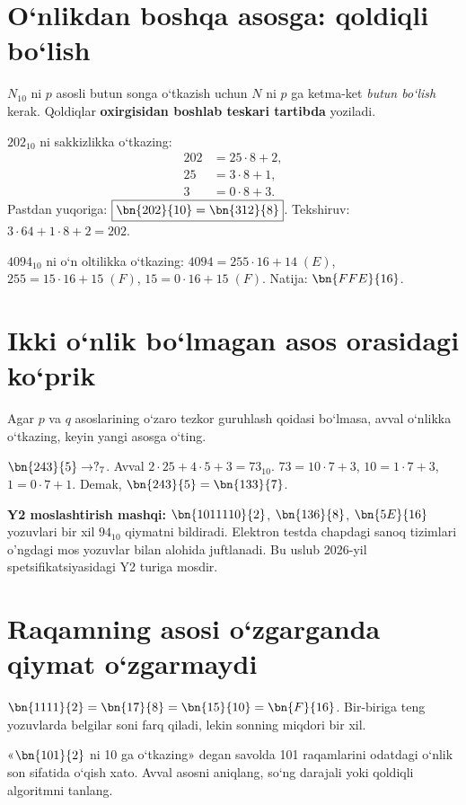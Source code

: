 \documentclass[11pt,a4paper,openany,oneside]{book}
\begin{document}
\section{O‘nlikdan boshqa asosga: qoldiqli bo‘lish}
\begin{definition}
\(N_{10}\) ni \(p\) asosli butun songa o‘tkazish uchun \(N\) ni \(p\) ga ketma-ket \emph{butun bo‘lish} kerak. Qoldiqlar \textbf{oxirgisidan boshlab teskari tartibda} yoziladi. 
\end{definition}
\begin{worked}
\(202_{10}\) ni sakkizlikka o‘tkazing:
\[\begin{aligned}
202 &= 25\cdot8+2,\\ 25&=3\cdot8+1,\\3&=0\cdot8+3.
\end{aligned}\]
Pastdan yuqoriga: \(\boxed{\bn{202}{10}=\bn{312}{8}}\). Tekshiruv: \(3\cdot64+1\cdot8+2=202\).
\end{worked}
\begin{worked}
\(4094_{10}\) ni o‘n oltilikka o‘tkazing:
\(4094=255\cdot16+14\;(E)\), \(255=15\cdot16+15\;(F)\), \(15=0\cdot16+15\;(F)\). Natija: \(\bn{FFE}{16}\).
\end{worked}
\section{Ikki o‘nlik bo‘lmagan asos orasidagi ko‘prik}
Agar \(p\) va \(q\) asoslarining o‘zaro tezkor guruhlash qoidasi bo‘lmasa, avval o‘nlikka o‘tkazing, keyin yangi asosga o‘ting.
\begin{worked}
\(\bn{243}{5}\to ?_7\). Avval \(2\cdot25+4\cdot5+3=73_{10}\). \(73=10\cdot7+3\), \(10=1\cdot7+3\), \(1=0\cdot7+1\). Demak, \(\bn{243}{5}=\bn{133}{7}\).
\end{worked}
\begin{important}
\textbf{Y2 moslashtirish mashqi:} \(\bn{1011110}{2}\), \(\bn{136}{8}\), \(\bn{5E}{16}\) yozuvlari bir xil \(94_{10}\) qiymatni bildiradi. Elektron testda chapdagi sanoq tizimlari o'ngdagi mos yozuvlar bilan alohida juftlanadi. Bu uslub 2026-yil spetsifikatsiyasidagi Y2 turiga mosdir. 
\end{important}
\section{Raqamning asosi o‘zgarganda qiymat o‘zgarmaydi}
\(\bn{1111}{2}=\bn{17}{8}=\bn{15}{10}=\bn{F}{16}\). Bir-biriga teng yozuvlarda belgilar soni farq qiladi, lekin sonning miqdori bir xil.
\begin{important}
«\(\bn{101}{2}\) ni 10 ga o‘tkazing» degan savolda 101 raqamlarini odatdagi o‘nlik son sifatida o‘qish xato. Avval asosni aniqlang, so‘ng darajali yoki qoldiqli algoritmni tanlang.
\end{important}
\end{document}

